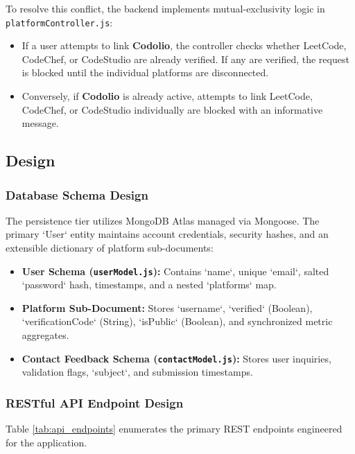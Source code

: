 \documentclass[12pt,a4paper]{article}
\begin{document}
To resolve this conflict, the backend implements mutual-exclusivity logic in \texttt{platformController.js}:
\begin{itemize}[leftmargin=*]
    \item If a user attempts to link \textbf{Codolio}, the controller checks whether LeetCode, CodeChef, or CodeStudio are already verified. If any are verified, the request is blocked until the individual platforms are disconnected.
    \item Conversely, if \textbf{Codolio} is already active, attempts to link LeetCode, CodeChef, or CodeStudio individually are blocked with an informative message.
\end{itemize}

\subsection{Design}

\subsubsection{Database Schema Design}
The persistence tier utilizes MongoDB Atlas managed via Mongoose. The primary `User` entity maintains account credentials, security hashes, and an extensible dictionary of platform sub-documents:

\begin{itemize}[leftmargin=*]
    \item \textbf{User Schema (\texttt{userModel.js}):} Contains `name`, unique `email`, salted `password` hash, timestamps, and a nested `platforms` map.
    \item \textbf{Platform Sub-Document:} Stores `username`, `verified` (Boolean), `verificationCode` (String), `isPublic` (Boolean), and synchronized metric aggregates.
    \item \textbf{Contact Feedback Schema (\texttt{contactModel.js}):} Stores user inquiries, validation flags, `subject`, and submission timestamps.
\end{itemize}

\subsubsection{RESTful API Endpoint Design}
Table \ref{tab:api_endpoints} enumerates the primary REST endpoints engineered for the application.
\end{document}
